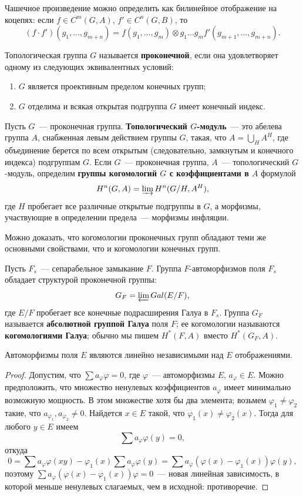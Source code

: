 \documentclass[a4paper,oneside,12pt]{article}
\theoremstyle{plain} { \swapnumbers
\newtheorem{theorem}{Теорема}[subsection]
\newtheorem{corollary}[theorem]{Следствие}
\newtheorem{lemma}[theorem]{Лемма}
\newtheorem{proposition}[theorem]{Утверждение}
\newtheorem{claim}[theorem]{Факт}
}
\theoremstyle{definition} { \swapnumbers
\newtheorem{definition}[theorem]{Определение}
\newtheorem{notation}[theorem]{Обозначение}
\newtheorem{remark}[theorem]{Замечание}
\newtheorem{remarks}[theorem]{Замечания}
\newtheorem{example}[theorem]{Пример}
\newtheorem{examples}[theorem]{Примеры}
\newtheorem{sssection}[theorem]{}
}
\def\ph{\varphi}
\begin{document}
Чашечное произведение можно определить как билинейное отображение на коцепях:
если $f\in C^m(G,A)$, $f'\in C^n(G,B)$, то
$$
(f\cdot f')(g_1,\dots,g_{m+n})=f(g_1,\dots,g_m)\otimes g_1\dots g_m f'(g_{m+1},\dots,g_{m+n}).
$$

\begin{definition}
Топологическая группа $G$ называется {\bf проконечной}, если она удовлетворяет одному из следующих эквивалентных условий:
\begin{enumerate}
\item $G$ является проективным пределом конечных групп;
\item $G$ отделима и всякая открытая подгруппа $G$ имеет конечный индекс.
\end{enumerate}
\end{definition}

\begin{definition}
Пусть $G$~--- проконечная группа. {\bf Топологический $G$-модуль}~--- это абелева группа $A$, снабженная
левым действием группы $G$, такая, что $A=\bigcup_HA^H$, где объединение берется по всем открытым
(следовательно, замкнутым и конечного индекса) подгруппам $G$.
Если $G$~--- проконечная группа, $A$~--- топологический $G$-модуль, определим
{\bf группы когомологий $G$ с коэффициентами в $A$} формулой
$$
H^n(G,A)=\varinjlim H^n(G/H,A^H),
$$
где $H$ пробегает все различные открытые подгруппы в $G$, а морфизмы, участвующие в
определении предела~--- морфизмы инфляции.
\end{definition}

Можно доказать, что когомологии проконечных групп обладают теми же основными свойствами, что и когомологии
конечных групп.
\begin{definition}
Пусть $F_s$~--- сепарабельное замыкание $F$. Группа $F$-автоморфизмов поля $F_s$ обладает
структурой проконечной группы:
$$
G_F=\varprojlim Gal(E/F),
$$
где $E/F$ пробегает все конечные подрасширения Галуа в $F_s$. Группа $G_F$ называется
{\bf абсолютной группой Галуа} поля $F$; ее когомологии называются {\bf когомологиями Галуа};
обычно мы пишем $H^*(F,A)$ вместо $H^*(G_F,A)$.
\end{definition}

\begin{lemma}\label{lemma:automorphisms_are_linearly_independent}
Автоморфизмы поля $E$ являются линейно независимыми над $E$ отображениями.
\end{lemma}
\begin{proof}
Допустим, что $\sum a_\ph\ph=0$, где $\ph$~--- автоморфизмы $E$, $a_\ph\in E$.
Можно предположить, что множество ненулевых коэффициентов $a_\ph$ имеет минимально возможную мощность.
В этом множестве хотя бы два элемента; возьмем $\ph_1\neq\ph_2$ такие, что $a_{\ph_1},a_{\ph_2}\neq 0$.
Найдется $x\in E$ такой, что $\ph_1(x)\neq\ph_2(x)$. Тогда для любого $y\in E$ имеем
$$
\sum a_\ph\ph(y)=0,
$$
откуда
$$
0=\sum a_\ph\ph(xy)-\ph_1(x)\sum a_\ph\ph(y)=\sum a_\ph(\ph(x)-\ph_1(x))\ph(y),
$$
поэтому $\sum a_\ph(\ph(x)-\ph_1(x))\ph=0$~--- новая линейная зависимость, в которой меньше ненулевых
слагаемых, чем в исходной: противоречие.
\end{proof}
\end{document}
